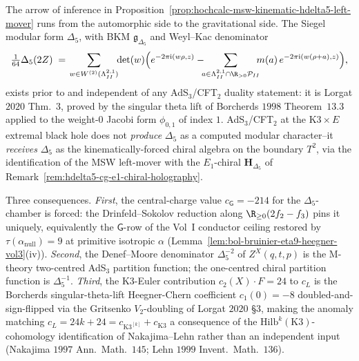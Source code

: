 \begin{remark}
\label{rem:hochcalc-delta5-kinematic-input-ads3-cft2}
The arrow of inference in
Proposition~\ref{prop:hochcalc-msw-kinematic-hdelta5-left-mover} runs
from the automorphic side to the gravitational side. The Siegel
modular form $\Delta_5$, with BKM $\mathfrak g_{\Delta_5}$ and
Weyl--Kac denominator
\[
 \tfrac{1}{64}\Delta_5(2Z) \;=\;
 \!\sum_{w\in W^{(2)}(\Lambda^{2,1}_{II})}\!\!\det(w)
 \Bigl(e^{-2\pi\mathrm i(w\rho,z)}
 -\!\!\!\sum_{a\in\Lambda^{2,1}_{II}\cap\R_{>0}\mathcal P_{II}}\!\!\!
 m(a)\,e^{-2\pi\mathrm i(w(\rho+a),z)}\Bigr),
\]
exists prior to and independent of any AdS$_3$/CFT$_2$ duality
statement: it is Lorgat $2020$ Thm.\ $3$, proved by the singular theta
lift of Borcherds $1998$ Theorem~$13.3$ applied to the weight-$0$ Jacobi
form $\phi_{0,1}$ of index $1$. AdS$_3$/CFT$_2$ at the
$\mathrm{K3}\times E$ extremal black hole does not \emph{produce}
$\Delta_5$ as a computed modular character--it \emph{receives}
$\Delta_5$ as the kinematically-forced chiral algebra on the boundary
$T^2$, via the identification of the MSW left-mover with the
$E_1$-chiral $\mathbf H_{\Delta_5}$ of
Remark~\ref{rem:hdelta5-cg-e1-chiral-holography}.

Three consequences. \emph{First}, the central-charge value
$c_{\mathsf G}=-214$ for the $\Delta_5$-chamber is forced: the
Drinfeld--Sokolov reduction along $\R_{\geq 0}(2f_2-f_3)$ pins it
uniquely, equivalently the $\mathsf G$-row of the Vol~I conductor
ceiling restored by $\tau(\alpha_{\mathrm{null}})=9$ at primitive isotropic $\alpha$
(Lemma~\ref{lem:bol-bruinier-eta9-heegner-vol3}(iv)). \emph{Second},
the Denef--Moore denominator $\Delta_5^{-2}$ of $Z^X(q,t,p)$ is the
M-theory two-centred AdS$_3$ partition function; the one-centred
chiral partition function is $\Delta_5^{-1}$. \emph{Third}, the
K3-Euler contribution $c_2(X){\cdot}F=24$ to $c_L$ is the Borcherds
singular-theta-lift Heegner-Chern coefficient $c_1(0)=-8$
doubled-and-sign-flipped via the Gritsenko $V_2$-doubling of
Lorgat $2020$ \S$3$, making the anomaly matching
$c_L=24k+24=c_{\mathrm{K3}^{[k]}}+c_{\mathrm{K3}}$ a consequence of
the $\mathrm{Hilb}^k(\mathrm{K3})$-cohomology identification of
Nakajima--Lehn rather than an independent input (Nakajima $1997$ Ann.\
Math.\ $145$; Lehn $1999$ Invent.\ Math.\ $136$).


\end{remark}
